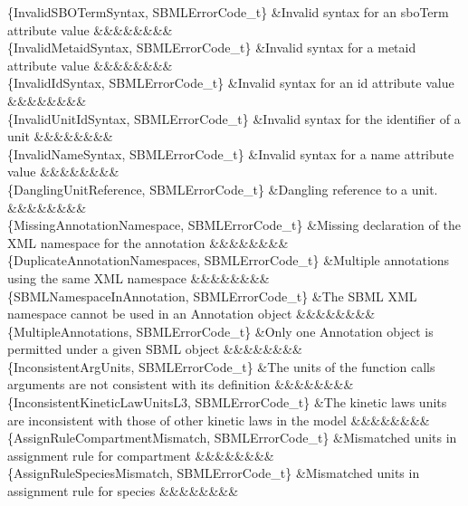\begin{DoxyParagraph}{}
\begin{longtabu}
\{Invalid\+S\+B\+O\+Term\+Syntax, S\+B\+M\+L\+Error\+Code\+\_\+t\} &Invalid syntax for an \textquotesingle{}sbo\+Term\textquotesingle{} attribute value &&&&&&&&\\
\{Invalid\+Metaid\+Syntax, S\+B\+M\+L\+Error\+Code\+\_\+t\} &Invalid syntax for a \textquotesingle{}metaid\textquotesingle{} attribute value &&&&&&&&\\
\{Invalid\+Id\+Syntax, S\+B\+M\+L\+Error\+Code\+\_\+t\} &Invalid syntax for an \textquotesingle{}id\textquotesingle{} attribute value &&&&&&&&\\
\{Invalid\+Unit\+Id\+Syntax, S\+B\+M\+L\+Error\+Code\+\_\+t\} &Invalid syntax for the identifier of a unit &&&&&&&&\\
\{Invalid\+Name\+Syntax, S\+B\+M\+L\+Error\+Code\+\_\+t\} &Invalid syntax for a \textquotesingle{}name\textquotesingle{} attribute value &&&&&&&&\\
\{Dangling\+Unit\+Reference, S\+B\+M\+L\+Error\+Code\+\_\+t\} &Dangling reference to a unit. &&&&&&&&\\
\{Missing\+Annotation\+Namespace, S\+B\+M\+L\+Error\+Code\+\_\+t\} &Missing declaration of the X\+ML namespace for the annotation &&&&&&&&\\
\{Duplicate\+Annotation\+Namespaces, S\+B\+M\+L\+Error\+Code\+\_\+t\} &Multiple annotations using the same X\+ML namespace &&&&&&&&\\
\{S\+B\+M\+L\+Namespace\+In\+Annotation, S\+B\+M\+L\+Error\+Code\+\_\+t\} &The S\+B\+ML X\+ML namespace cannot be used in an Annotation object &&&&&&&&\\
\{Multiple\+Annotations, S\+B\+M\+L\+Error\+Code\+\_\+t\} &Only one Annotation object is permitted under a given S\+B\+ML object &&&&&&&&\\
\{Inconsistent\+Arg\+Units, S\+B\+M\+L\+Error\+Code\+\_\+t\} &The units of the function call\textquotesingle{}s arguments are not consistent with its definition &&&&&&&&\\
\{Inconsistent\+Kinetic\+Law\+Units\+L3, S\+B\+M\+L\+Error\+Code\+\_\+t\} &The kinetic law\textquotesingle{}s units are inconsistent with those of other kinetic laws in the model &&&&&&&&\\
\{Assign\+Rule\+Compartment\+Mismatch, S\+B\+M\+L\+Error\+Code\+\_\+t\} &Mismatched units in assignment rule for compartment &&&&&&&&\\
\{Assign\+Rule\+Species\+Mismatch, S\+B\+M\+L\+Error\+Code\+\_\+t\} &Mismatched units in assignment rule for species &&&&&&&&\\

\end{longtabu}
\end{DoxyParagraph}
